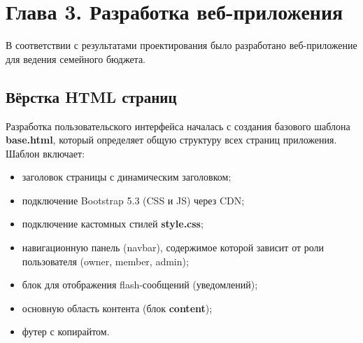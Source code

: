 \section*{Глава 3. Разработка веб-приложения}

В соответствии с результатами проектирования было разработано веб-приложение для ведения семейного бюджета.

\subsection{Вёрстка HTML страниц}

Разработка пользовательского интерфейса началась с создания базового шаблона \textbf{base.html}, который определяет общую структуру всех страниц приложения. Шаблон включает:
\begin{itemize}
    \item заголовок страницы с динамическим заголовком;
    \item подключение Bootstrap 5.3 (CSS и JS) через CDN;
    \item подключение кастомных стилей \textbf{style.css};
    \item навигационную панель (navbar), содержимое которой зависит от роли пользователя (owner, member, admin);
    \item блок для отображения flash-сообщений (уведомлений);
    \item основную область контента (блок \textbf{content});
    \item футер с копирайтом.
\end{itemize}

